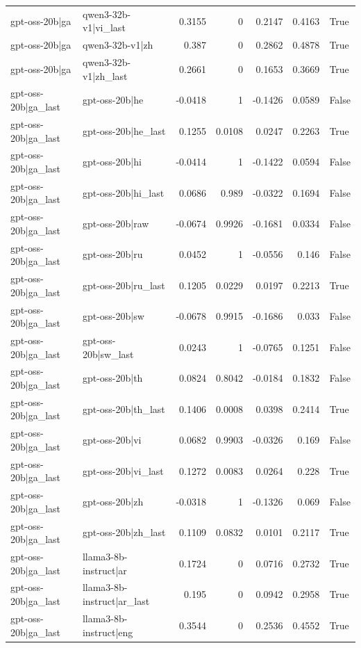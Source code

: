\begin{table}
\begin{tabular}{l l r r r r l}
gpt-oss-20b|ga & qwen3-32b-v1|vi_last & 0.3155 & 0 & 0.2147 & 0.4163 & True \\
gpt-oss-20b|ga & qwen3-32b-v1|zh & 0.387 & 0 & 0.2862 & 0.4878 & True \\
gpt-oss-20b|ga & qwen3-32b-v1|zh_last & 0.2661 & 0 & 0.1653 & 0.3669 & True \\
gpt-oss-20b|ga_last & gpt-oss-20b|he & -0.0418 & 1 & -0.1426 & 0.0589 & False \\
gpt-oss-20b|ga_last & gpt-oss-20b|he_last & 0.1255 & 0.0108 & 0.0247 & 0.2263 & True \\
gpt-oss-20b|ga_last & gpt-oss-20b|hi & -0.0414 & 1 & -0.1422 & 0.0594 & False \\
gpt-oss-20b|ga_last & gpt-oss-20b|hi_last & 0.0686 & 0.989 & -0.0322 & 0.1694 & False \\
gpt-oss-20b|ga_last & gpt-oss-20b|raw & -0.0674 & 0.9926 & -0.1681 & 0.0334 & False \\
gpt-oss-20b|ga_last & gpt-oss-20b|ru & 0.0452 & 1 & -0.0556 & 0.146 & False \\
gpt-oss-20b|ga_last & gpt-oss-20b|ru_last & 0.1205 & 0.0229 & 0.0197 & 0.2213 & True \\
gpt-oss-20b|ga_last & gpt-oss-20b|sw & -0.0678 & 0.9915 & -0.1686 & 0.033 & False \\
gpt-oss-20b|ga_last & gpt-oss-20b|sw_last & 0.0243 & 1 & -0.0765 & 0.1251 & False \\
gpt-oss-20b|ga_last & gpt-oss-20b|th & 0.0824 & 0.8042 & -0.0184 & 0.1832 & False \\
gpt-oss-20b|ga_last & gpt-oss-20b|th_last & 0.1406 & 0.0008 & 0.0398 & 0.2414 & True \\
gpt-oss-20b|ga_last & gpt-oss-20b|vi & 0.0682 & 0.9903 & -0.0326 & 0.169 & False \\
gpt-oss-20b|ga_last & gpt-oss-20b|vi_last & 0.1272 & 0.0083 & 0.0264 & 0.228 & True \\
gpt-oss-20b|ga_last & gpt-oss-20b|zh & -0.0318 & 1 & -0.1326 & 0.069 & False \\
gpt-oss-20b|ga_last & gpt-oss-20b|zh_last & 0.1109 & 0.0832 & 0.0101 & 0.2117 & True \\
gpt-oss-20b|ga_last & llama3-8b-instruct|ar & 0.1724 & 0 & 0.0716 & 0.2732 & True \\
gpt-oss-20b|ga_last & llama3-8b-instruct|ar_last & 0.195 & 0 & 0.0942 & 0.2958 & True \\
gpt-oss-20b|ga_last & llama3-8b-instruct|eng & 0.3544 & 0 & 0.2536 & 0.4552 & True \\

\end{tabular}
\end{table}
